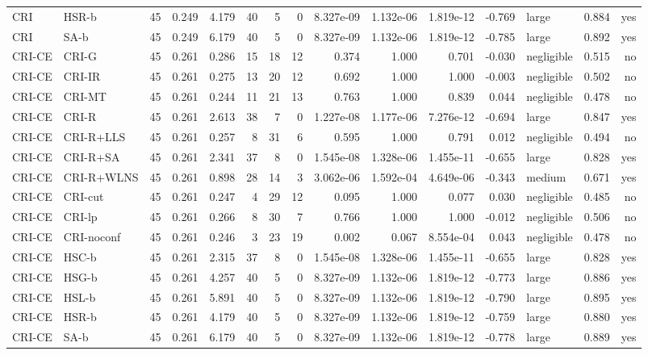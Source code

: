 \begin{table}[htbp]
\begin{tabular}{llrrrrrrrrrrlrr}
CRI & HSR-b & 45 & 0.249 & 4.179 & 40 & 5 & 0 & 8.327e-09 & 1.132e-06 & 1.819e-12 & -0.769 & large & 0.884 & yes \\
CRI & SA-b & 45 & 0.249 & 6.179 & 40 & 5 & 0 & 8.327e-09 & 1.132e-06 & 1.819e-12 & -0.785 & large & 0.892 & yes \\
CRI-CE & CRI-G & 45 & 0.261 & 0.286 & 15 & 18 & 12 & 0.374 & 1.000 & 0.701 & -0.030 & negligible & 0.515 & no \\
CRI-CE & CRI-IR & 45 & 0.261 & 0.275 & 13 & 20 & 12 & 0.692 & 1.000 & 1.000 & -0.003 & negligible & 0.502 & no \\
CRI-CE & CRI-MT & 45 & 0.261 & 0.244 & 11 & 21 & 13 & 0.763 & 1.000 & 0.839 & 0.044 & negligible & 0.478 & no \\
CRI-CE & CRI-R & 45 & 0.261 & 2.613 & 38 & 7 & 0 & 1.227e-08 & 1.177e-06 & 7.276e-12 & -0.694 & large & 0.847 & yes \\
CRI-CE & CRI-R+LLS & 45 & 0.261 & 0.257 & 8 & 31 & 6 & 0.595 & 1.000 & 0.791 & 0.012 & negligible & 0.494 & no \\
CRI-CE & CRI-R+SA & 45 & 0.261 & 2.341 & 37 & 8 & 0 & 1.545e-08 & 1.328e-06 & 1.455e-11 & -0.655 & large & 0.828 & yes \\
CRI-CE & CRI-R+WLNS & 45 & 0.261 & 0.898 & 28 & 14 & 3 & 3.062e-06 & 1.592e-04 & 4.649e-06 & -0.343 & medium & 0.671 & yes \\
CRI-CE & CRI-cut & 45 & 0.261 & 0.247 & 4 & 29 & 12 & 0.095 & 1.000 & 0.077 & 0.030 & negligible & 0.485 & no \\
CRI-CE & CRI-lp & 45 & 0.261 & 0.266 & 8 & 30 & 7 & 0.766 & 1.000 & 1.000 & -0.012 & negligible & 0.506 & no \\
CRI-CE & CRI-noconf & 45 & 0.261 & 0.246 & 3 & 23 & 19 & 0.002 & 0.067 & 8.554e-04 & 0.043 & negligible & 0.478 & no \\
CRI-CE & HSC-b & 45 & 0.261 & 2.315 & 37 & 8 & 0 & 1.545e-08 & 1.328e-06 & 1.455e-11 & -0.655 & large & 0.828 & yes \\
CRI-CE & HSG-b & 45 & 0.261 & 4.257 & 40 & 5 & 0 & 8.327e-09 & 1.132e-06 & 1.819e-12 & -0.773 & large & 0.886 & yes \\
CRI-CE & HSL-b & 45 & 0.261 & 5.891 & 40 & 5 & 0 & 8.327e-09 & 1.132e-06 & 1.819e-12 & -0.790 & large & 0.895 & yes \\
CRI-CE & HSR-b & 45 & 0.261 & 4.179 & 40 & 5 & 0 & 8.327e-09 & 1.132e-06 & 1.819e-12 & -0.759 & large & 0.880 & yes \\
CRI-CE & SA-b & 45 & 0.261 & 6.179 & 40 & 5 & 0 & 8.327e-09 & 1.132e-06 & 1.819e-12 & -0.778 & large & 0.889 & yes \\

\end{tabular}
\end{table}

